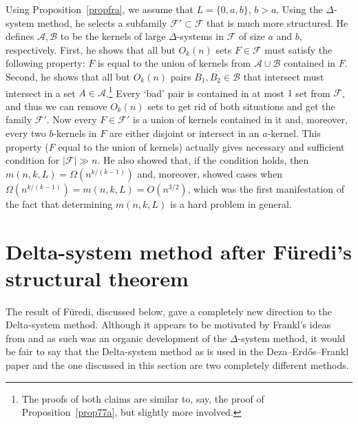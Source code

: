 \documentclass[graybox]{svmult}
\newcommand{\ff}{\mathcal{F}}
\newcommand{\aaa}{\mathcal{A}}
\newcommand{\bb}{\mathcal{B}}
\newcommand{\m}{\mathcal}
\begin{document}
Using Proposition~\ref{propfra}, we assume that $L=\{0,a,b\}$, $b>a$. Using the $\Delta$-system method, he selects a subfamily $\ff'\subset \ff$ that is much more structured. He defines $\m A, \m B$ to be the kernels of large $\Delta$-systems in $\ff$ of size $a$ and $b$, respectively. First, he shows that all but $O_k(n)$ sets $F\in \ff$ must satisfy the following property: $F$ is equal to the union of kernels from $\aaa\cup \bb$ contained in $F$. Second, he shows that all but $O_k(n)$ pairs $B_1,B_2\in \bb$ that intersect must intersect in a set $A\in \m A$.\footnote{The proofs of both claims are similar to, say, the proof of Proposition~\ref{prop77a}, but slightly more involved.} Every `bad' pair is contained in at most $1$ set from $\ff$, and thus we can remove $O_k(n)$ sets to get rid of both situations and get the family $\ff'$. Now every $F\in \ff'$ is a union of kernels contained in it and, moreover, every two $b$-kernels in $F$ are either disjoint or intersect in an $a$-kernel. This property ($F$ equal to the union of kernels) actually gives necessary and sufficient condition for $|\ff|\gg n$. He also showed that, if the condition holds, then $m(n,k,L) = \Omega(n^{k/(k-1)})$ and, moreover, showed cases when $\Omega(n^{k/(k-1)})=m(n,k,L)=O(n^{3/2})$, which was the first manifestation of the fact that determining $m(n,k,L)$ is a hard problem in general.

\section{Delta-system method after F{\"{u}}redi's structural theorem}\label{sec3}

The result of F\"uredi, discussed below, gave a completely new direction to the Delta-system method. Although it appears to be  motivated by Frankl's ideas from \cite{Fra83} and as such was an organic development of the $\Delta$-system method, it would be fair to say that the Delta-system method as is used in the Deza--Erd\H os--Frankl paper and the one discussed in this section are two completely different methods.
\end{document}
